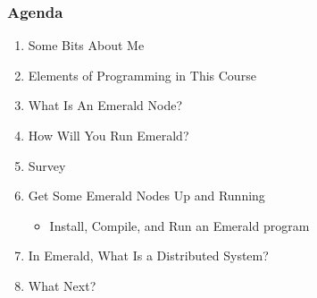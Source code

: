 \begin{frame}

\frametitle{Agenda}

\begin{enumerate}

\item Some Bits About Me

\item Elements of Programming in This Course

\item What Is An Emerald Node?

\item How Will You Run Emerald?

\item Survey

\item Get Some Emerald Nodes Up and Running

\begin{itemize}

\footnotesize

\item Install, Compile, and Run an Emerald program

\end{itemize}

\item In Emerald, What Is a Distributed System?

\item What Next?

\end{enumerate}

\end{frame}
